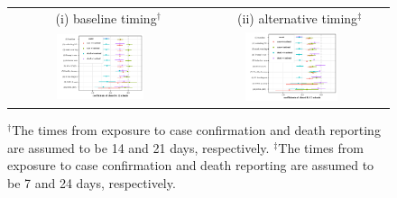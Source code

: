 \documentclass[3p, longtitle]{elsarticle}
\theoremstyle{definition}
\begin{document}
\begin{figure}[ht]
\begin{minipage}{\linewidth}
    \medskip
    \begin{tabular}{cc}
 $\quad$  (i) baseline timing$^\dagger$ &$\quad$ (ii) alternative timing$^\ddagger$\\
      \includegraphics[width=0.5\textwidth]{tables_and_figures/pk12-whisker-14}
      &
      \includegraphics[width=0.5\textwidth]{tables_and_figures/pk12-whisker-7}
          \end{tabular}
  \end{minipage}
    \begin{flushleft}
      \footnotesize
      $^\dagger$The times from exposure to case confirmation and death reporting  are assumed to be 14 and 21 days, respectively. $^\ddagger$The times from exposure to case confirmation and death reporting  are assumed to be 7 and 24 days, respectively.
    \end{flushleft}
\end{figure}
\end{document}

